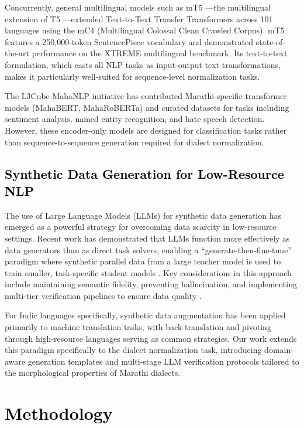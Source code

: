 Concurrently, general multilingual models such as mT5 \cite{xue2021mt5}---the multilingual extension of T5 \cite{raffel2020exploring}---extended Text-to-Text Transfer Transformers across 101 languages using the mC4 (Multilingual Colossal Clean Crawled Corpus). mT5 features a 250,000-token SentencePiece vocabulary and demonstrated state-of-the-art performance on the XTREME multilingual benchmark. Its text-to-text formulation, which casts all NLP tasks as input-output text transformations, makes it particularly well-suited for sequence-level normalization tasks.

The L3Cube-MahaNLP initiative \cite{joshi2022l3cube} has contributed Marathi-specific transformer models (MahaBERT, MahaRoBERTa) and curated datasets for tasks including sentiment analysis, named entity recognition, and hate speech detection. However, these encoder-only models are designed for classification tasks rather than sequence-to-sequence generation required for dialect normalization.

\subsection{\textcolor{black}{Synthetic Data Generation for Low-Resource NLP}}

The use of Large Language Models (LLMs) for synthetic data generation has emerged as a powerful strategy for overcoming data scarcity in low-resource settings. Recent work has demonstrated that LLMs function more effectively as data generators than as direct task solvers, enabling a ``generate-then-fine-tune'' paradigm where synthetic parallel data from a large teacher model is used to train smaller, task-specific student models \cite{gemma2024}. Key considerations in this approach include maintaining semantic fidelity, preventing hallucination, and implementing multi-tier verification pipelines to ensure data quality \cite{ansary2024unicode}.

For Indic languages specifically, synthetic data augmentation has been applied primarily to machine translation tasks, with back-translation and pivoting through high-resource languages serving as common strategies. Our work extends this paradigm specifically to the dialect normalization task, introducing domain-aware generation templates and multi-stage LLM verification protocols tailored to the morphological properties of Marathi dialects.

\section{\textcolor{black}{Methodology}}
\label{sec:methodology}


